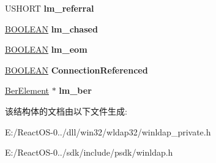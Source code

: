 \begin{DoxyCompactItemize}
\item 
\mbox{\label{structldapmsg_adbd006397182a9105b9b6bee3f2e8f72}} 
U\+S\+H\+O\+RT {\bfseries lm\+\_\+referral}
\item 
\mbox{\label{structldapmsg_a9e33129a95dbe4a5a92b09942b23cd76}} 
\hyperlink{_processor_bind_8h_a112e3146cb38b6ee95e64d85842e380a}{B\+O\+O\+L\+E\+AN} {\bfseries lm\+\_\+chased}
\item 
\mbox{\label{structldapmsg_ab2979fb0ee569fb470dc6566e21369d6}} 
\hyperlink{_processor_bind_8h_a112e3146cb38b6ee95e64d85842e380a}{B\+O\+O\+L\+E\+AN} {\bfseries lm\+\_\+eom}
\item 
\mbox{\label{structldapmsg_a7118599ab8b49ef2b2739df0fdbbcce5}} 
\hyperlink{_processor_bind_8h_a112e3146cb38b6ee95e64d85842e380a}{B\+O\+O\+L\+E\+AN} {\bfseries Connection\+Referenced}
\item 
\mbox{\label{structldapmsg_a6a9c6e891e534adc29d00504008c03ed}} 
\hyperlink{structberelement}{Ber\+Element} $\ast$ {\bfseries lm\+\_\+ber}
\end{DoxyCompactItemize}


该结构体的文档由以下文件生成\+:\begin{DoxyCompactItemize}
\item 
E\+:/\+React\+O\+S-\/0../dll/win32/wldap32/winldap\+\_\+private.\+h\item 
E\+:/\+React\+O\+S-\/0../sdk/include/psdk/winldap.\+h\end{DoxyCompactItemize}
